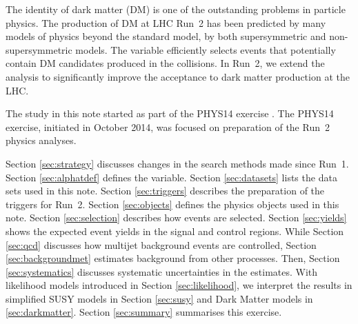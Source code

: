 The identity of dark matter (DM) is one of the outstanding problems in
particle physics. The production of DM at LHC Run~2 has been predicted
by many models of physics beyond the standard model, by both
supersymmetric and non-supersymmetric models. The \alphat variable
efficiently selects events that potentially contain DM candidates
produced in the collisions. In Run~2, we extend the \alphat analysis
to significantly improve the acceptance to dark matter production at
the LHC.

The study in this note started as part of the PHYS14 exercise
\cite{PHYS14}. The PHYS14 exercise, initiated in October 2014, was
focused on preparation of the Run~2 physics analyses. 

Section \ref{sec:strategy} discusses changes in the search methods
made since Run~1. Section \ref{sec:alphatdef} defines the \alphat
variable.  Section \ref{sec:datasets} lists the data sets used in this
note.  Section \ref{sec:triggers} describes the preparation of the
triggers for Run~2. Section \ref{sec:objects} defines the physics
objects used in this note. Section \ref{sec:selection} describes how
events are selected. Section \ref{sec:yields} shows the expected event
yields in the signal and control regions. While Section \ref{sec:qcd}
discusses how multijet background events are controlled, Section
\ref{sec:backgroundmet} estimates background from other
processes. Then, Section \ref{sec:systematics} discusses systematic
uncertainties in the estimates. With likelihood models introduced in
Section \ref{sec:likelihood}, we interpret the results in simplified
SUSY models in Section \ref{sec:susy} and Dark Matter models in
\ref{sec:darkmatter}. Section \ref{sec:summary} summarises this
exercise.

